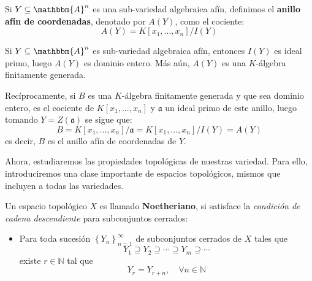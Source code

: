 \documentclass[12pt]{report}
\newcounter{it}
\theoremstyle{largebreak}
\newcommand{\bbm}[1]{\ensuremath{\mathbbm{#1}}}
\newcommand{\fk}[1]{\ensuremath{\mathfrak{#1}}}
\begin{document}
    \begin{mydef}
        Si $Y\subseteq\bbm{A}^n$ es una sub-variedad algebraica afín, definimos el \textbf{anillo afín de coordenadas}, denotado por $A(Y)$, como el cociente:
        \begin{equation*}
            A(Y)=K[x_1,...,x_n]/I(Y)
        \end{equation*}
    \end{mydef}

    \begin{obs}
        Si $Y\subseteq\bbm{A}^n$ es sub-variedad algebraica afín, entonces $I(Y)$ es ideal primo, luego $A(Y)$ es dominio entero. Más aún, $A(Y)$ es una $K$-álgebra finitamente generada.

        Recíprocamente, si $B$ es una $K$-álgebra finitamente generada y que sea dominio entero, es el cociente de $K[x_1,...,x_n]$ y $\fk{a}$ un ideal primo de este anillo, luego tomando $Y=Z(\fk{a})$ se sigue que:
        \begin{equation*}
            B=K[x_1,...,x_n]/\fk{a}=K[x_1,...,x_n]/I(Y)=A(Y)
        \end{equation*}
        es decir, $B$ es el anillo afín de coordenadas de $Y$.
    \end{obs}

    Ahora, estudiaremos las propiedades topológicas de nuestras variedad. Para ello, introduciremos una clase importante de espacios topológicos, mismos que incluyen a todas las variedades.

    \begin{mydef}
        Un espacio topológico $X$ es llamado \textbf{Noetheriano}, si satisface la \textit{condición de cadena descendiente} para subconjuntos cerrados:
        \begin{itemize}
            \item Para toda sucesión $\left\{Y_n \right\}_{ n=1}^\infty$ de subconjuntos cerrados de $X$ tales que
            \begin{equation*}
                Y_1\supseteq Y_2\supseteq\cdots\supseteq Y_m\supseteq\cdots
            \end{equation*}
            existe $r\in\mathbb{N}$ tal que
            \begin{equation*}
                Y_r=Y_{ r+n},\quad\forall n\in\mathbb{N}
            \end{equation*}
        \end{itemize}
    \end{mydef}
\end{document}
